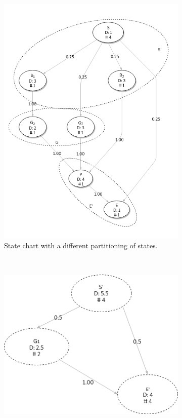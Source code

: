 \begin{figure}[H]
    \centering
    \begin{subfigure}[b]{0.6\textwidth}
        \includegraphics[width=\textwidth]{Diagrams/Statecharts/statemachine_preview2.png}
        \caption{State chart with a different partitioning of states.}
        \label{fig:preview2}
    \end{subfigure}
    \\ %
    \begin{subfigure}[b]{0.45\textwidth}
        \includegraphics[width=\textwidth]{Diagrams/Statecharts/statemachine_view2.png}

\end{subfigure}
\end{figure}
